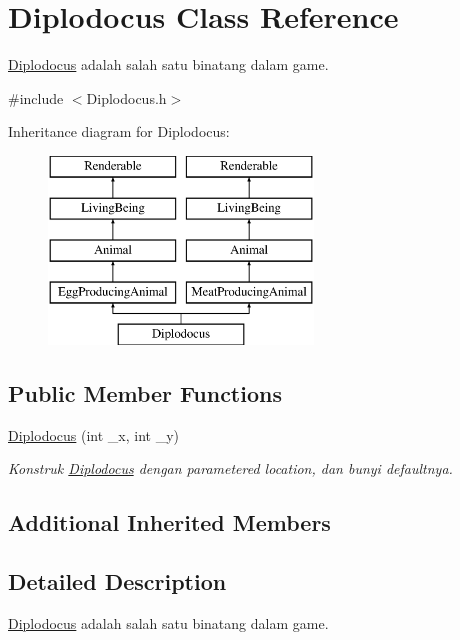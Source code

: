 \hypertarget{classDiplodocus}{}\section{Diplodocus Class Reference}
\label{classDiplodocus}


\mbox{\hyperlink{classDiplodocus}{Diplodocus}} adalah salah satu binatang dalam game.  




{\ttfamily \#include $<$Diplodocus.\+h$>$}

Inheritance diagram for Diplodocus\+:\begin{figure}[H]
\begin{center}
\leavevmode
\includegraphics[height=5.000000cm]{classDiplodocus}
\end{center}
\end{figure}
\subsection*{Public Member Functions}
\begin{DoxyCompactItemize}
\item 
\mbox{\hyperlink{classDiplodocus_a2cd0b6edd66f2bbacb3b8eb141836901}{Diplodocus}} (int \+\_\+x, int \+\_\+y)
\begin{DoxyCompactList}\small\item\em Konstruk \mbox{\hyperlink{classDiplodocus}{Diplodocus}} dengan parametered location, dan bunyi defaultnya. \end{DoxyCompactList}\end{DoxyCompactItemize}
\subsection*{Additional Inherited Members}


\subsection{Detailed Description}
\mbox{\hyperlink{classDiplodocus}{Diplodocus}} adalah salah satu binatang dalam game. 

